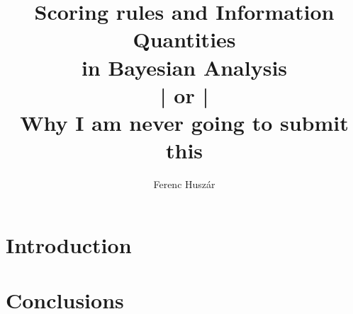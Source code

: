 \documentclass[11pt]{book}
\title{Scoring rules and Information Quantities\\in Bayesian Analysis \\ | or | \\ Why I am never going to submit this}
\author{Ferenc Husz\'{a}r}
\makeatletter
\theoremstyle{definition}
\newcommand{\ChapterOutsidePart}{%
   \def\toclevel@chapter{-1}\def\toclevel@section{0}\def\toclevel@subsection{1}}
\newcommand{\ChapterInsidePart}{%
   \def\toclevel@chapter{0}\def\toclevel@section{1}\def\toclevel@subsection{2}}
\makeatother
\begin{document}
\maketitle

\ChapterOutsidePart 
{}
\tableofcontents

\chapter{Introduction}


\ChapterInsidePart




\ChapterOutsidePart
\chapter{Conclusions}




\end{document}

